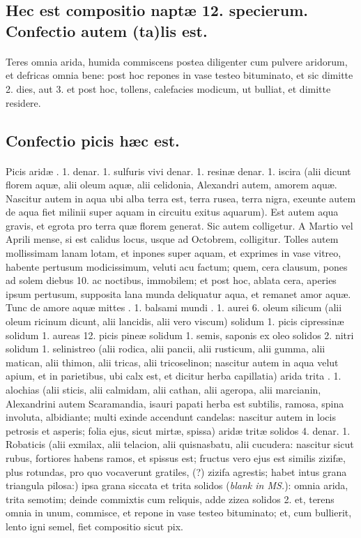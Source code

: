 \documentclass[a4paper, 11pt, oneside, polutonikogreek, italian]{article}
\begin{document}
\subsection{Hec est compositio naptæ 12. specierum. Confectio autem (ta)lis est.}
\paragraph{}
Teres omnia arida, humida commiscens postea diligenter cum pulvere aridorum, et defricas omnia bene: post hoc repones in vase testeo bituminato, et sic dimitte 2. dies, aut 3. et post hoc, tollens, calefacies modicum, ut bulliat, et dimitte residere.

\subsection{Confectio picis hæc est.}
\paragraph{}
Picis aridæ \roundz. 1. denar. 1. sulfuris vivi denar. 1. resinæ denar. 1. iscira (alii dicunt florem aquæ, alii oleum aquæ, alii celidonia, Alexandri autem, amorem aquæ. Nascitur autem in aqua ubi alba terra est, terra rusea, terra nigra, exeunte autem de aqua fiet milinii super aquam in circuitu exitus aquarum). Est autem aqua gravis, et egrota pro terra quæ florem generat. Sic autem colligetur. A Martio vel Aprili mense, si est calidus locus, usque ad Octobrem, colligitur. Tolles autem mollissimam lanam lotam, et inpones super aquam, et exprimes in vase vitreo, habente pertusum modicissimum, veluti acu factum; quem, cera clausum, pones ad solem diebus 10. ac noctibus, immobilem; et post hoc, ablata cera, aperies ipsum pertusum, supposita lana munda deliquatur aqua, et remanet amor aquæ. Tunc de amore aquæ mittes \roundz. 1. balsami mundi \roundz. 1. aurei 6. oleum silicum (alii oleum ricinum dicunt, alii lancidis, alii vero viscum) solidum 1. picis cipressinæ solidum 1. aureas 12. picis pineæ solidum 1. semis, saponis ex oleo solidos 2. nitri solidum 1. selinistreo (alii rodica, alii pancii, alii rusticum, alii gumma, alii matican, alii thimon, alii tricas, alii tricoselinon; nascitur autem in aqua velut apium, et in parietibus, ubi calx est, et dicitur herba capillatia) arida trita \roundz. 1. alochias (alii sticis, alii calmidam, alii cathan, alii ageropa, alii marcianin, Alexandrini autem Scaramandia, isauri papati herba est subtilis, ramosa, spina involuta, albidiante; multi exinde accendunt candelas: nascitur autem in locis petrosis et asperis; folia ejus, sicut mirtæ, spissa) aridæ tritæ solidos 4. denar. 1. Robaticis (alii exmilax, alii telacion, alii quisnasbatu, alii cucudera: nascitur sicut rubus, fortiores habens ramos, et spissus est; fructus vero ejus est similis zizifæ, plus rotundas, pro quo vocaverunt gratiles, (?) zizifa agrestis; habet intus grana triangula pilosa:) ipsa grana siccata et trita solidos (\emph{blank in MS.}): omnia arida, trita semotim; deinde commixtis cum reliquis, adde zizea solidos 2. et, terens omnia in unum, commisce, et repone in vase testeo bituminato; et, cum bullierit, lento igni semel, fiet compositio sicut pix.
\end{document}
